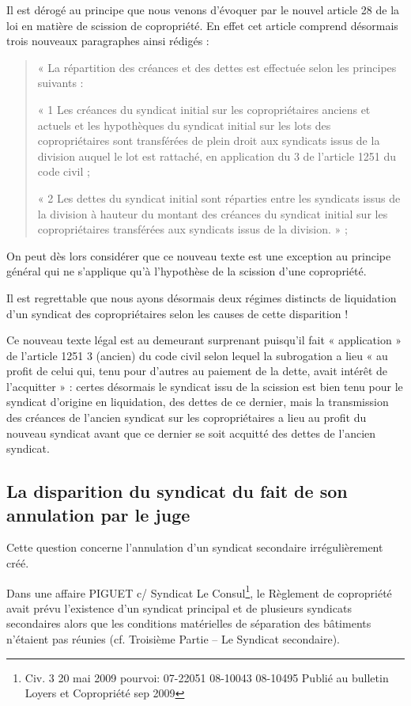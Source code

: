 				Il est dérogé au principe que nous venons d’évoquer par le nouvel article 28 de la loi en matière de scission de copropriété. En effet cet article comprend désormais trois nouveaux paragraphes ainsi rédigés :
				\begin{quote}
					« La répartition des créances et des dettes est effectuée selon les principes suivants :
				
					« 1\degre{} Les créances du syndicat initial sur les copropriétaires anciens et actuels et les hypothèques du syndicat initial sur les lots des copropriétaires sont transférées de plein droit aux syndicats issus de la division auquel le lot est rattaché, en application du 3\degre{} de l’article 1251 du code civil ;
				
					« 2\degre{} Les dettes du syndicat initial sont réparties entre les syndicats issus de la division à hauteur du montant des créances du syndicat initial sur les copropriétaires transférées aux syndicats issus de la division. » ;
				\end{quote}
				
				On peut dès lors considérer que ce nouveau texte est une exception au principe général qui ne s’applique qu’à l’hypothèse de la scission d’une copropriété.
				
				Il est regrettable que nous ayons désormais deux régimes distincts de liquidation d’un syndicat des copropriétaires selon les causes de cette disparition !
				
				Ce nouveau texte légal est au demeurant surprenant puisqu’il fait « application » de l’article 1251 3\degre{} (ancien) du code civil selon lequel la subrogation a lieu « au profit de celui qui, tenu pour d’autres au paiement de la dette, avait intérêt de l’acquitter » : certes désormais le syndicat issu de la scission est bien tenu pour le syndicat d’origine en liquidation, des dettes de ce dernier, mais la transmission des créances de l’ancien syndicat sur les copropriétaires a lieu au profit du nouveau syndicat avant que ce dernier se soit acquitté des dettes de l’ancien syndicat.

	\subsection{La disparition du syndicat du fait de son annulation par le juge}
	
		Cette question concerne l’annulation d’un syndicat secondaire irrégulièrement créé.
		
		Dans une affaire PIGUET c/ Syndicat Le Consul\footnote{Civ. 3\degre{} 20 mai 2009 pourvoi: 07-22051 08-10043 08-10495 Publié au bulletin Loyers et Copropriété sep 2009 }, le Règlement de copropriété avait prévu l’existence d’un syndicat principal et de plusieurs syndicats secondaires alors que les conditions matérielles de séparation des bâtiments n’étaient pas réunies (cf. Troisième Partie – Le Syndicat secondaire).
		
